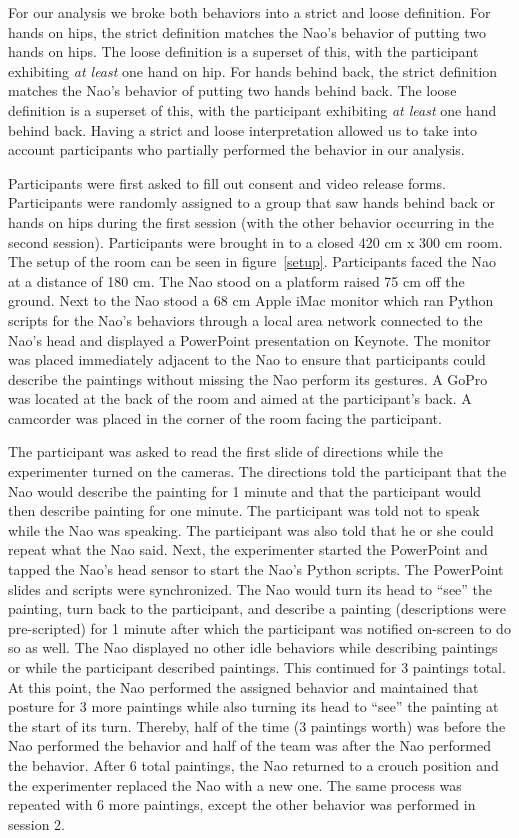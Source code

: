\documentclass{acm_proc_article-sp}
\begin{document}
For our analysis we broke both behaviors into a strict and loose definition. For hands on hips, the strict definition matches the Nao's behavior of putting two hands on hips. The loose definition is a superset of this, with the participant exhibiting \textit{at least} one hand on hip. For hands behind back, the strict definition matches the Nao's behavior of putting two hands behind back. The loose definition is a superset of this, with the participant exhibiting \textit{at least} one hand behind back. Having a strict and loose interpretation allowed us to take into account participants who partially performed the behavior in our analysis. 

Participants were first asked to fill out consent and video release forms. Participants were randomly assigned to a group that saw hands behind back or hands on hips during the first session (with the other behavior occurring in the second session). Participants were brought in to a closed 420 cm x 300 cm room. The setup of the room can be seen in figure~\ref{setup}. Participants faced the Nao at a distance of 180 cm. The Nao stood on a platform raised 75 cm off the ground. Next to the Nao stood a 68 cm Apple iMac monitor which ran Python scripts for the Nao's behaviors through a local area network connected to the Nao's head and displayed a PowerPoint presentation on Keynote. The monitor was placed immediately adjacent to the Nao to ensure that participants could describe the paintings without missing the Nao perform its gestures. A GoPro was located at the back of the room and aimed at the participant's back. A camcorder was placed in the corner of the room facing the participant.

The participant was asked to read the first slide of directions while the experimenter turned on the cameras. The directions told the participant that the Nao would describe the painting for 1 minute and that the participant would then describe painting for one minute. The participant was told not to speak while the Nao was speaking. The participant was also told that he or she could repeat what the Nao said. Next, the experimenter started the PowerPoint and tapped the Nao's head sensor to start the Nao's Python scripts. The PowerPoint slides and scripts were synchronized. The Nao would turn its head to ``see'' the painting, turn back to the participant, and describe a painting (descriptions were pre-scripted) for 1 minute after which the participant was notified on-screen to do so as well. The Nao displayed no other idle behaviors while describing paintings or while the participant described paintings. This continued for 3 paintings total. At this point, the Nao performed the assigned behavior and maintained that posture for 3 more paintings while also turning its head to ``see'' the painting at the start of its turn. Thereby, half of the time (3 paintings worth) was before the Nao performed the behavior and half of the team was after the Nao performed the behavior. After 6 total paintings, the Nao returned to a crouch position and the experimenter replaced the Nao with a new one. The same process was repeated with 6 more paintings, except the other behavior was performed in session 2. 
\end{document}
